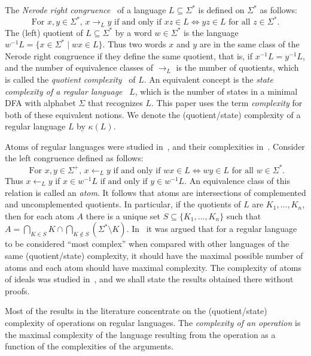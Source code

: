 \documentclass[final]{dmtcs-episciences}
\newcommand{\Sig}{\Sigma}
\theoremstyle{definition}
\theoremstyle{remark}
\begin{document}
The \emph{Nerode right congruence}~\cite{Ner58} of a language $L\subseteq \Sig^*$ is defined on $\Sig^*$ as follows:
$$
\mbox{For $x, y \in \Sig^*$, } x \rightarrow_L  y \mbox{ if and only if } xz\in L  \Leftrightarrow yz\in L\mbox { for all } z \in\Sig^*.
$$
The (left) quotient of $L\subseteq \Sig^*$ by a word $w\in \Sig^*$ is the language 
$w^{-1}L=\{x\in\Sig^*\mid wx\in L\}$.
Thus two words $x$ and $y$ are in the same class of the Nerode right congruence if they define the same quotient, that is, if $x^{-1}L=y^{-1}L$, and  
the number of equivalence classes of $\rightarrow_L$ is the number of quotients, which is called the 
 \emph{quotient complexity}~\cite{Brz10} of $L$.
An equivalent concept is
the \emph{state complexity of a regular language}~\cite{Yu01} $L$, which  is the number of states in a minimal DFA with alphabet $\Sig$ that recognizes $L$. 
This paper uses  the term \emph{complexity} for both of these equivalent notions.
We denote the (quotient/state) complexity of a regular language $L$ by $\kappa(L)$.

Atoms of regular languages were studied in~\cite{BrTa14}, and their complexities  
in~\cite{BrDa14,BrTa13,Iva16}.
Consider the left congruence defined as follows:
$$
\mbox{ For $x, y \in \Sig^+$, } x \leftarrow_L y  \mbox{ if and only if }  wx\in L  \Leftrightarrow wy\in L
\mbox { for all } w\in\Sig^*.
$$
Thus $x \leftarrow_L y$ if $x\in w^{-1}L \text{ if and only if } y\in w^{-1}L$. 
An equivalence class of this relation is called an \emph{atom}.
It follows that atoms are intersections of complemented and uncomplemented quotients.
In particular, if the quotients of $L$ are $K_1,\dotsc,K_n$, then for each atom $A$ there is a unique set $S \subseteq \{K_1,\dotsc,K_n\}$ such that
$A = \bigcap_{K \in S} K \cap \bigcap_{K \not\in S} (\Sig^* \setminus K)$.
In~\cite{Brz13} it was argued that 
for a regular language to be considered ``most complex'' when compared with other languages of the same (quotient/state) complexity, it should have the maximal possible number of atoms and each atom should have maximal complexity.
The complexity of atoms of ideals was studied in~\cite{BrDa14,BrDa15}, and we shall  state the results obtained there without proofs.

Most of the results in the literature concentrate on the (quotient/state) complexity of operations on regular languages.
The \emph{complexity of an operation} is the maximal  complexity of the language resulting from the operation as a function of the  complexities of the arguments.
\end{document}
